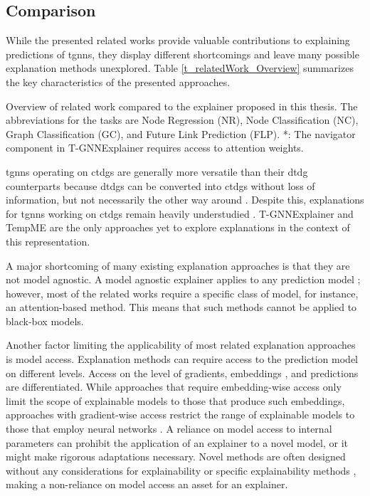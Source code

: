 \subsection{Comparison}
\label{s_relateWork_comparison}

While the presented related works provide valuable contributions to explaining predictions of \glspl{tgnn}, they display different shortcomings and leave many possible explanation methods unexplored. Table \ref{t_relatedWork_Overview} summarizes the key characteristics of the presented approaches. 

\begin{table}[ht]
    \centering
    \footnotesize
    
    \caption{Overview of related work compared to the explainer proposed in this thesis. The abbreviations for the tasks are Node Regression (NR), Node Classification (NC), Graph Classification (GC), and Future Link Prediction (FLP). *: The navigator component in T-GNNExplainer requires access to attention weights.}
    \label{t_relatedWork_Overview}
\end{table}

\glspl{tgnn} operating on \glspl{ctdg} are generally more versatile than their \gls{dtdg} counterparts because \glspl{dtdg} can be converted into \glspl{ctdg} without loss of information, but not necessarily the other way around \cite{souza_provably_2022}. Despite this, explanations for \glspl{tgnn} working on \glspl{ctdg} remain heavily understudied \cite{chen_tempme_2023}. T-GNNExplainer \cite{xia_explaining_2023} and TempME \cite{chen_tempme_2023} are the only approaches yet to explore explanations in the context of this representation.

A major shortcoming of many existing explanation approaches is that they are not model agnostic. A model agnostic explainer applies to any prediction model \cite{prado-romero_survey_2023}; however, most of the related works require a specific class of model, for instance, an attention-based method. This means that such methods cannot be applied to black-box models.

Another factor limiting the applicability of most related explanation approaches is model access. Explanation methods can require access to the prediction model on different levels. Access on the level of gradients, embeddings \cite{verma_counterfactual_2020}, and predictions are differentiated. While approaches that require embedding-wise access only limit the scope of explainable models to those that produce such embeddings, approaches with gradient-wise access restrict the range of explainable models to those that employ neural networks \cite{prado-romero_survey_2023}. A reliance on model access to internal parameters can prohibit the application of an explainer to a novel model, or it might make rigorous adaptations necessary. Novel methods are often designed without any considerations for explainability or specific explainability methods \cite{xia_explaining_2023}, making a non-reliance on model access an asset for an explainer.

